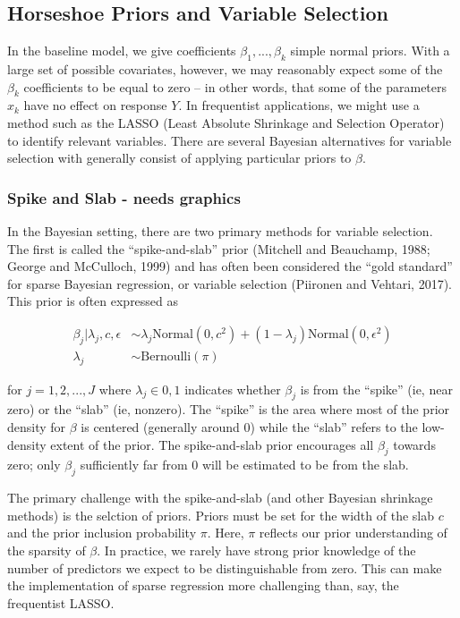 \documentclass[
]{article}
\begin{document}
\hypertarget{horseshoe-priors-and-variable-selection}{%
\subsection{Horseshoe Priors and Variable
Selection}\label{horseshoe-priors-and-variable-selection}}

In the baseline model, we give coefficients \(\beta_1, ..., \beta_k\)
simple normal priors. With a large set of possible covariates, however,
we may reasonably expect some of the \(\beta_k\) coefficients to be
equal to zero -- in other words, that some of the parameters \(x_k\)
have no effect on response \(Y\). In frequentist applications, we might
use a method such as the LASSO (Least Absolute Shrinkage and Selection
Operator) to identify relevant variables. There are several Bayesian
alternatives for variable selection with generally consist of applying
particular priors to \(\beta\).

\hypertarget{spike-and-slab---needs-graphics}{%
\subsubsection{Spike and Slab - needs
graphics}\label{spike-and-slab---needs-graphics}}

In the Bayesian setting, there are two primary methods for variable
selection. The first is called the ``spike-and-slab'' prior (Mitchell
and Beauchamp, 1988; George and McCulloch, 1999) and has often been
considered the ``gold standard'' for sparse Bayesian regression, or
variable selection (Piironen and Vehtari, 2017). This prior is often
expressed as

\[
\begin{aligned}
\beta_j | \lambda_j, c, \epsilon & \sim \lambda_j \text{Normal}(0, c^2) + (1-\lambda_j)\text{Normal}(0, \epsilon^2) \\
\lambda_j & \sim \text{Bernoulli}(\pi)
\end{aligned}
\]

for \(j = 1, 2, ..., J\) where \(\lambda_j \in {0, 1}\) indicates
whether \(\beta_j\) is from the ``spike'' (ie, near zero) or the
``slab'' (ie, nonzero). The ``spike'' is the area where most of the
prior density for \(\beta\) is centered (generally around 0) while the
``slab'' refers to the low-density extent of the prior. The
spike-and-slab prior encourages all \(\beta_j\) towards zero; only
\(\beta_j\) sufficiently far from 0 will be estimated to be from the
slab.

The primary challenge with the spike-and-slab (and other Bayesian
shrinkage methods) is the selction of priors. Priors must be set for the
width of the slab \(c\) and the prior inclusion probability \(\pi\).
Here, \(\pi\) reflects our prior understanding of the sparsity of
\(\beta\). In practice, we rarely have strong prior knowledge of the
number of predictors we expect to be distinguishable from zero. This can
make the implementation of sparse regression more challenging than, say,
the frequentist LASSO.
\end{document}
